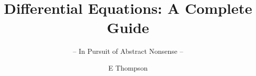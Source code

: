 \documentclass[graybox,envcountchap,sectrefs]{style/svmono}
\begin{document}
\author{E Thompson}
\title{Differential Equations: A Complete Guide}
\subtitle{-- In Pursuit of Abstract Nonsense --}
\maketitle

\frontmatter%

%
%

%

\tableofcontents

%


\mainmatter%



















\backmatter%

%
%
\printindex

\end{document}
